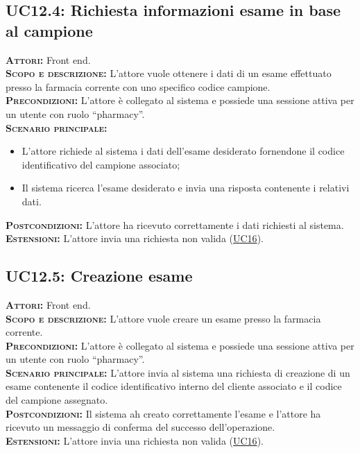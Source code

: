 \subsection{UC12.4: Richiesta informazioni esame in base al campione}
\label{sec:UC124}
\textsc{\textbf{Attori:}} Front end.\\
\textsc{\textbf{Scopo e descrizione:}} L'attore vuole ottenere i dati di un esame  effettuato presso la farmacia corrente con uno specifico codice campione.\\
\textsc{\textsc{\textbf{Precondizioni:}}} L'attore è collegato al sistema e possiede una sessione attiva per un utente con ruolo ``pharmacy''.\\
\textsc{\textbf{Scenario principale:}}
\begin{itemize}
    \item L'attore richiede al sistema i dati dell'esame desiderato fornendone il codice identificativo del campione associato;
    \item Il sistema ricerca l'esame desiderato e invia una risposta contenente i relativi dati.
\end{itemize} 
\textsc{\textbf{Postcondizioni:}} L'attore ha ricevuto correttamente i dati richiesti al sistema.\\
\textsc{\textbf{Estensioni:}} L'attore invia una richiesta non valida (\hyperref[sec:UC16]{UC16}).

\subsection{UC12.5: Creazione esame}
\label{sec:UC125}
\textsc{\textbf{Attori:}} Front end.\\
\textsc{\textbf{Scopo e descrizione:}} L'attore vuole creare un esame presso la farmacia corrente.\\
\textsc{\textsc{\textbf{Precondizioni:}}} L'attore è collegato al sistema e possiede una sessione attiva per un utente con ruolo ``pharmacy''.\\
\textsc{\textbf{Scenario principale:}} L'attore invia al sistema una richiesta di creazione di un esame contenente il codice identificativo interno del cliente associato e il codice del campione assegnato.\\
\textsc{\textbf{Postcondizioni:}} Il sistema ah creato correttamente l'esame e l'attore ha ricevuto un messaggio di conferma del successo dell'operazione.\\
\textsc{\textbf{Estensioni:}} L'attore invia una richiesta non valida (\hyperref[sec:UC16]{UC16}).

